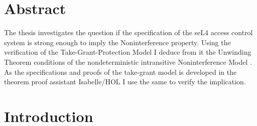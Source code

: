 \documentclass[pdftex,11pt,a4paper,twoside]{article}
\begin{document}
	
	\deckblatt
	
	\declaration
	
	\clearpage
	\section*{Abstract}
	
	 The thesis investigates the question if the specification of the seL4 access control system is strong enough to imply the Noninterference property. 
Using the verification of the Take-Grant-Protection Model \cite{TakeG} I deduce from it the Unwinding Theorem conditions of the nondeterministic intransitive Noninterference Model \cite{NonOp}. 
As the specifications and proofs of the take-grant model is developed in the theorem proof assistant Isabelle/HOL I use the same to verify the implication. 
	

	\newpage
	\listoffigures
	\newpage
	\tableofcontents

	
	\clearpage
	\section{Introduction}
\end{document}
